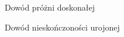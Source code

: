 \begin{easyappendix}{Dowód próżni doskonałej}
\end{easyappendix}

\begin{easyappendix}{Dowód nieskończoności urojonej}
\end{easyappendix}
